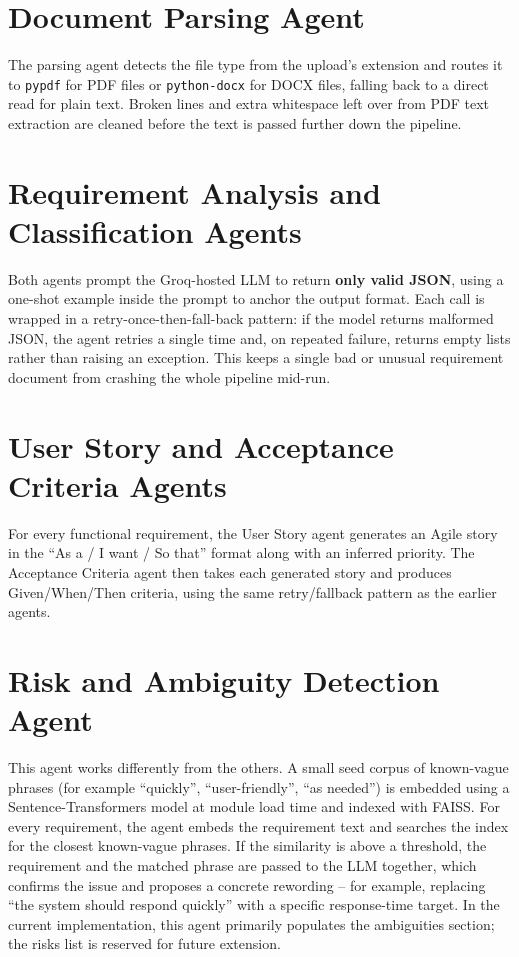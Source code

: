 \documentclass[12pt,a4paper,openany]{report}
\begin{document}
\section{Document Parsing Agent}
The parsing agent detects the file type from the upload's extension and
routes it to \texttt{pypdf} for PDF files or \texttt{python-docx} for DOCX
files, falling back to a direct read for plain text. Broken lines and
extra whitespace left over from PDF text extraction are cleaned before the
text is passed further down the pipeline.

\section{Requirement Analysis and Classification Agents}
Both agents prompt the Groq-hosted LLM to return \textbf{only valid JSON},
using a one-shot example inside the prompt to anchor the output format.
Each call is wrapped in a retry-once-then-fall-back pattern: if the model
returns malformed JSON, the agent retries a single time and, on repeated
failure, returns empty lists rather than raising an exception. This keeps
a single bad or unusual requirement document from crashing the whole
pipeline mid-run.

\section{User Story and Acceptance Criteria Agents}
For every functional requirement, the User Story agent generates an Agile
story in the ``As a / I want / So that'' format along with an inferred
priority. The Acceptance Criteria agent then takes each generated story
and produces Given/When/Then criteria, using the same retry/fallback
pattern as the earlier agents.

\section{Risk and Ambiguity Detection Agent}
This agent works differently from the others. A small seed corpus of
known-vague phrases (for example ``quickly'', ``user-friendly'', ``as
needed'') is embedded using a Sentence-Transformers model at module load
time and indexed with FAISS. For every requirement, the agent embeds the
requirement text and searches the index for the closest known-vague
phrases. If the similarity is above a threshold, the requirement and the
matched phrase are passed to the LLM together, which confirms the issue
and proposes a concrete rewording -- for example, replacing ``the system
should respond quickly'' with a specific response-time target. In the
current implementation, this agent primarily populates the ambiguities
section; the risks list is reserved for future extension.
\end{document}
